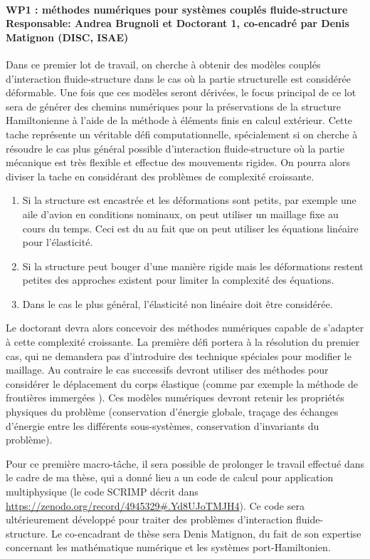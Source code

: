 \documentclass[12pt, french]{article}
\begin{document}
\paragraph{\large WP1 : méthodes numériques pour systèmes couplés fluide-structure\\
Responsable: Andrea Brugnoli et Doctorant 1, co-encadré par Denis Matignon (DISC, ISAE)\\}
 Dans ce premier lot de travail, on cherche à obtenir des modèles couplés d'interaction fluide-structure dans le cas où la partie structurelle est considérée déformable. Une fois que ces modèles seront dérivées, le focus principal de ce lot sera de générer des chemins numériques pour la préservations de la structure Hamiltonienne à l'aide de la méthode à éléments finis en calcul extérieur. Cette tache représente un véritable défi computationnelle, spécialement si on cherche à résoudre le cas plus général possible d'interaction fluide-structure où la partie mécanique est très flexible et effectue des mouvements rigides. On pourra alors diviser la tache en considérant des problèmes de complexité croissante. 
\begin{enumerate}
	\item Si la structure est encastrée et les déformations sont petits, par exemple une aile d'avion en conditions nominaux, on peut utiliser un maillage fixe au cours du temps. Ceci est du au fait que on peut utiliser les équations linéaire pour l'élasticité. 
	\item Si la structure peut bouger d'une manière rigide mais les déformations restent petites des approches existent pour limiter la complexité des équations.
	\item Dans le cas le plus général, l'élasticité non linéaire doit être considérée.
\end{enumerate}
Le doctorant devra alors concevoir des méthodes numériques capable de s'adapter à cette complexité croissante. La première défi portera à la résolution du premier cas, qui ne demandera pas d'introduire des technique spéciales pour modifier le maillage. Au contraire le cas successifs devront utiliser des méthodes pour considérer le déplacement du corps élastique (comme par exemple la méthode de frontières immergées \cite{peskin2002}). Ces modèles numériques devront retenir les propriétés physiques du problème (conservation d'énergie globale, traçage des échanges d'énergie entre les différents sous-systèmes, conservation d'invariants du problème).

Pour ce première macro-tâche, il sera possible de prolonger le travail effectué dans le cadre de ma thèse, qui a donn\'e lieu a un code de calcul pour application multiphysique (le code SCRIMP décrit dans \url{https://zenodo.org/record/4945329#.Yd8UJoTMJH4}). Ce code sera ultérieurement développé pour traiter des problèmes d'interaction fluide-structure. Le co-encadrant de thèse sera Denis Matignon, du fait de son expertise concernant les mathématique numérique et les systèmes port-Hamiltonien.
\end{document}
